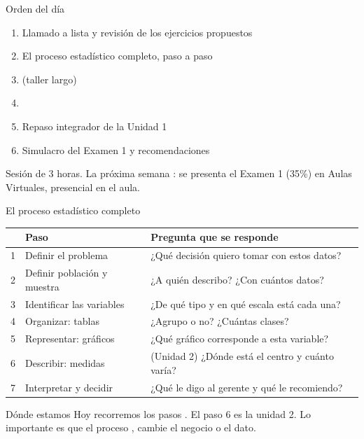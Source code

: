 \documentclass[aspectratio=169,10pt]{beamer}
\begin{document}
\portada

\begin{frame}{Orden del día}
  \begin{enumerate}
    \item Llamado a lista y revisión de los ejercicios propuestos
    \item El proceso estadístico completo, paso a paso
    \item {} (taller largo)
    \item {}
    \item Repaso integrador de la Unidad 1
    \item Simulacro del Examen 1 y recomendaciones
  \end{enumerate}

  \vspace{0.25cm}
  {\footnotesize\color{uniGris} Sesión de 3 horas. La próxima semana
  : se presenta el Examen 1 (35\%) en Aulas
  Virtuales, presencial en el aula.}
\end{frame}

\begin{frame}{El proceso estadístico completo}
  \scriptsize
  \begin{center}
  \begin{tabular}{@{}rp{4.3cm}p{6.6cm}@{}}
    \toprule
    & \textbf{Paso} & \textbf{Pregunta que se responde} \\
    \midrule
    1 & Definir el problema & ¿Qué decisión quiero tomar con estos datos? \\
    2 & Definir población y muestra & ¿A quién describo? ¿Con cuántos datos? \\
    3 & Identificar las variables & ¿De qué tipo y en qué escala está cada una? \\
    4 & Organizar: tablas & ¿Agrupo o no? ¿Cuántas clases? \\
    5 & Representar: gráficos & ¿Qué gráfico corresponde a esta variable? \\
    6 & Describir: medidas & (Unidad 2) ¿Dónde está el centro y cuánto varía? \\
    7 & Interpretar y decidir & ¿Qué le digo al gerente y qué le recomiendo? \\
    \bottomrule
  \end{tabular}
  \end{center}

  \vspace{0.1cm}
  \begin{alertblock}{Dónde estamos}
    \scriptsize
    Hoy recorremos los pasos . El paso 6 es la unidad 2.
    Lo importante es que el proceso , cambie el
    negocio o el dato.
  \end{alertblock}
\end{frame}
\end{document}
